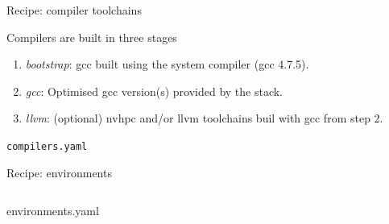\documentclass[aspectratio=43]{beamer}
\begin{document}
\begin{frame}[fragile]{Recipe: compiler toolchains}

Compilers are built in three stages
\begin{enumerate}
\item \emph{bootstrap}: gcc built using the system compiler (gcc 4.7.5).
\item \emph{gcc}: Optimised gcc version(s) provided by the stack.
\item \emph{llvm}: (optional) nvhpc and/or llvm toolchains buil with gcc from step 2.
\end{enumerate}



\begin{code}{\lstinline{compilers.yaml}}

\end{code}

\end{frame}

\begin{frame}[fragile]{Recipe: environments}

    \begin{columns}[T]
        \begin{column}{0.5\textwidth}
        \begin{codecolumn}{environments.yaml}

        \end{codecolumn}
        \end{column}
        \begin{column}{0.5\textwidth}
        \begin{codecolumnnotitle}{}

        \end{codecolumnnotitle}
        \end{column}
    \end{columns}

\end{frame}
\end{document}
